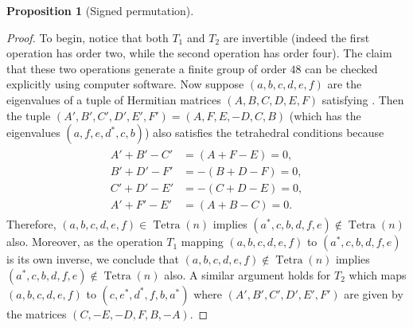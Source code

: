 \documentclass[pdflatex, sn-mathphys-num]{sn-jnl} %
\theoremstyle{plain}
\newtheorem{prop}[thm]{Proposition}
\theoremstyle{definition}
\let\cref\crtcref
\DeclareMathOperator{\Tetra}{Tetra}
\newcommand{\ea}{a}
\newcommand{\eb}{b}
\newcommand{\ec}{c}
\newcommand{\ed}{d}
\newcommand{\ee}{e}
\newcommand{\ef}{f}
\begin{document}
\begin{prop}[Signed permutation]
\end{prop}
\begin{proof}
    To begin, notice that both $T_1$ and $T_2$ are invertible (indeed the first operation has order two, while the second operation has order four).
    The claim that these two operations generate a finite group of order $48$ can be checked explicitly using computer software.
    Now suppose $(\ea,\eb,\ec,\ed,\ee,\ef)$ are the eigenvalues of a tuple of Hermitian matrices $(A,B,C,D,E,F)$ satisfying \cref{eq:tet_cond}.
    Then the tuple $(A',B',C',D',E',F') = (A,F,E,-D,C,B)$ (which has the eigenvalues $(\ea, \ef, \ee, \ed^{*}, \ec, \eb)$) also satisfies the tetrahedral conditions because
    \begin{align}
        \label{eq:signed_perm_rows}
        \begin{split}
            A'+B'-C' &= (A+F-E) = 0,  \\
            B'+D'-F' &= -(B+D-F) = 0, \\
            C'+D'-E' &= -(C+D-E) = 0, \\
            A'+F'-E' &= (A+B-C) = 0.
        \end{split}
    \end{align}
    Therefore, $(\ea,\eb,\ec,\ed,\ee,\ef) \in \Tetra(n)$ implies $(\ea^*, \ec, \eb, \ed, \ef, \ee) \not \in \Tetra(n)$ also.
    Moreover, as the operation $T_1$ mapping $(\ea,\eb,\ec,\ed,\ee,\ef)$ to $(\ea^*, \ec, \eb, \ed, \ef, \ee)$ is its own inverse, we conclude that $(\ea,\eb,\ec,\ed,\ee,\ef) \not \in \Tetra(n)$ implies $(\ea^*, \ec, \eb, \ed, \ef, \ee) \not \in \Tetra(n)$ also.
    A similar argument holds for $T_2$ which maps $(\ea,\eb,\ec,\ed,\ee,\ef)$ to $(\ec, \ee^*, \ed^{*}, \ef, \eb, \ea^*)$ where $(A',B',C',D',E',F')$ are given by the matrices $(C,-E,-D,F,B,-A)$.
\end{proof}
\end{document}
